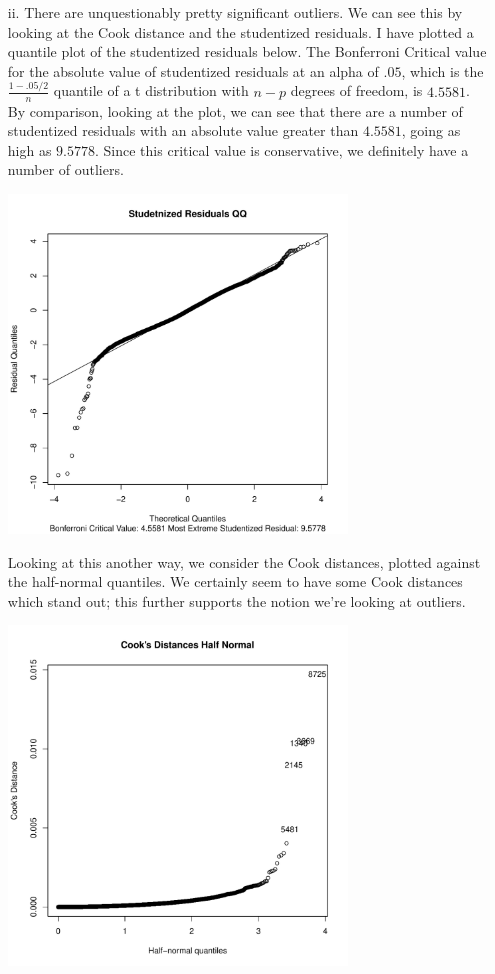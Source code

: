 \documentclass[11pt]{article}
\theoremstyle{definition}
\begin{document}
\begin{itemize}
\begin{itemize}
\begin{itemize}
                    \item[ii.]
                        There are unquestionably pretty significant outliers. We can see this by looking at the Cook distance and the studentized residuals. I have plotted a quantile plot of the studentized residuals below. The Bonferroni Critical value for the absolute value of studentized residuals at an alpha of $.05$, which is the \(\frac{1-.05/2}{n}\) quantile of a t distribution with $n-p$ degrees of freedom, is $4.5581$. By comparison, looking at the plot, we can see that there are a number of studentized residuals with an absolute value greater than $4.5581$, going as high as $9.5778$. Since this critical value is conservative, we definitely have a number of outliers.
                        \begin{center}
                            \includegraphics[width=9cm]{final/2aii_stud_qq} 
                        \end{center}
                        Looking at this another way, we consider the Cook distances, plotted against the half-normal quantiles. We certainly seem to have some Cook distances which stand out; this further supports the notion we're looking at outliers.
                        \begin{center}
                            \includegraphics[width=9cm]{final/2aii_cook} 

\end{center}
\end{itemize}
\end{itemize}
\end{itemize}
\end{document}
